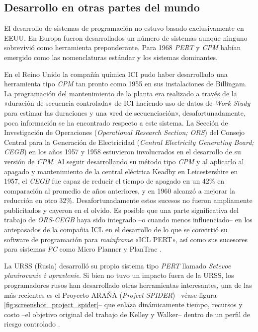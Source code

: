 \documentclass[spanish,draft,12pt,headsepline,footsepline,paper=letter]{scrreprt}
\begin{document}
\subsection{Desarrollo en otras partes del mundo} %
\label{sub:desarrollo_otras_partes_mundo}

El desarrollo de sistemas de programación no estuvo basado exclusivamente en EEUU. En Europa fueron desarrollados un número de sistemas aunque ninguno sobrevivió como herramienta preponderante. Para 1968 \textit{PERT} y \textit{CPM} habían emergido como las nomenclaturas estándar y los sistemas dominantes.

En el Reino Unido la compañía química ICI pudo haber desarrollado una herramienta tipo \textit{CPM} tan pronto como 1955 en sus instalaciones de Billingam. La programación del mantenimiento de la planta era realizado a través de la «duración de secuencia controlada» de ICI haciendo uso de datos de \textit{Work Study} para estimar las duraciones y una «red de secuenciación», desafortunadamente, poca información se ha encontrado respecto a este sistema. 
%
La Sección de Investigación de Operaciones (\textit{Operational Research Section; ORS}) del Consejo Central para la Generación de Electricidad (\textit{Central Electricity Generating Board; CEGB}) en los años 1957 y 1958 estuvieron involucrados en el desarrollo de su versión de \textit{CPM}. Al seguir desarrollando su método tipo \textit{CPM} y al aplicarlo al apagado y mantenimiento de la central eléctrica Keadby en Leicestershire en 1957, el \textit{CEGB} fue capaz de reducir el tiempo de apagado en un 42\% en comparación al promedio de años anteriores, y en 1960 alcanzó a mejorar la reducción en otro 32\%. Desafortunadamente estos sucesos no fueron ampliamente publicitados y cayeron en el olvido. Es posible que una parte significativa del trabajo de \textit{ORS-CEGB} haya sido integrado –o cuando menos influenciado– en los antepasados de la compañia ICL en el desarrollo de lo que se convirtió su software de programación para \textit{mainframe} «ICL PERT», así como sus sucesores para sistemas \textit{PC} como Micro Planner y PlanTrac \citep[p.~8]{Weaver2006}.

La URSS (Rusia) desarrolló su propio sistema tipo \textit{PERT} llamado \textit{Setevoe planirovanie i upravlenie}. Si bien no tuvo un impacto fuera de la URSS, los programadores rusos han desarrollado otras herramientas interesantes, una de las más recientes es el Proyecto ARAÑA (\textit{Project SPIDER}) –véase figura \ref{fig:screenshot_project_spider}– que enlaza dinámicamente tiempo, recursos y costo –el objetivo original del trabajo de Kelley y Walker– dentro de un perfil de riesgo controlado \citep[p.~8]{Weaver2006}.
\end{document}
